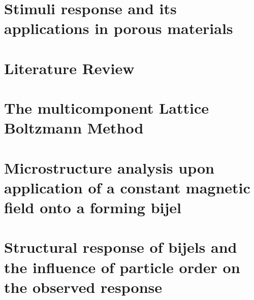 \documentclass[12pt]{book}
\begin{document}
\newpage

\tableofcontents
\thispagestyle{empty}

\newpage

\listoffigures

\newpage

\listoftables

\newpage

\setcounter{page}{1}

\chapter{Stimuli response and its applications in porous materials}


\chapter{Literature Review}


\chapter{The multicomponent Lattice Boltzmann Method}








\chapter{Microstructure analysis upon application of a constant magnetic field onto a forming bijel}



\chapter{Structural response of bijels and the influence of particle order on the observed response}
\end{document}
